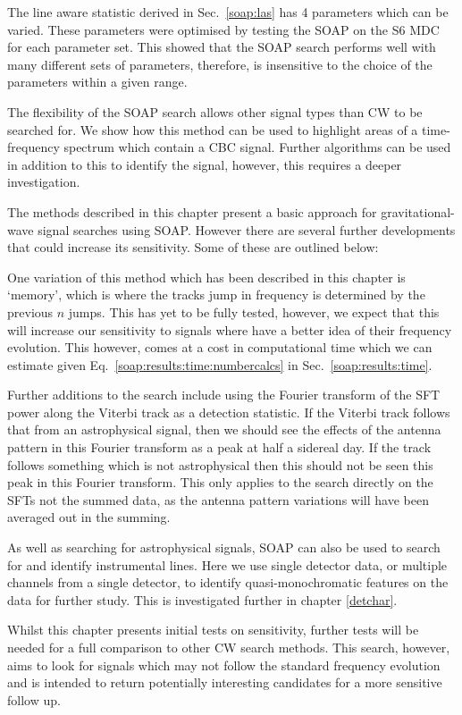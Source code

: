 The line aware statistic derived in Sec.~\ref{soap:las} has 4 parameters which can be varied. 
These parameters were optimised by testing the SOAP on the S6 \gls{MDC} for each parameter set. 
This showed that the SOAP search performs well with many different sets of parameters, therefore, is insensitive to the choice of the parameters within a given range. 

The flexibility of the SOAP search allows other signal types than \gls{CW} to be searched for. We show how this method can be used to highlight areas of a time-frequency spectrum which contain a \gls{CBC} signal. 
Further algorithms can be used in addition to this to identify the signal, however, this requires a deeper investigation.

%
%
The methods described in this chapter present a basic approach for gravitational-wave signal searches using SOAP. However there are several further developments that could increase its sensitivity. Some of these are outlined below:

One variation of this method which has been described in this chapter is `memory', which is where the tracks jump in frequency is determined by the previous $n$ jumps. This has yet to be fully tested, however, we expect that this will increase our sensitivity to signals where have a better idea of their frequency evolution. This however, comes at a cost in computational time which we can estimate given Eq.~\ref{soap:results:time:numbercalcs} in Sec.~\ref{soap:results:time}.

Further additions to the search include using the Fourier transform of the \gls{SFT} power along the Viterbi track as a detection statistic.
If the Viterbi track follows that from an astrophysical signal, then we should see the effects of the antenna pattern in this Fourier transform as a peak at half a sidereal day.
If the track follows something which is not astrophysical then this should not be seen this peak in this Fourier transform.
This only applies to the search directly on the \glspl{SFT} not the summed data, as the antenna pattern variations will have been averaged out in the summing.

As well as searching for astrophysical signals, SOAP can also be used to search for and identify instrumental lines. Here we use single detector data, or multiple channels from a single detector, to identify quasi-monochromatic features on the data for further study. This is investigated further in chapter \ref{detchar}.

Whilst this chapter presents initial tests on sensitivity, further tests will be needed for a full comparison to other \gls{CW} search methods.  
This search, however, aims to look for signals which may not follow the standard
frequency evolution and is intended to return potentially interesting
candidates for a more sensitive follow up.


